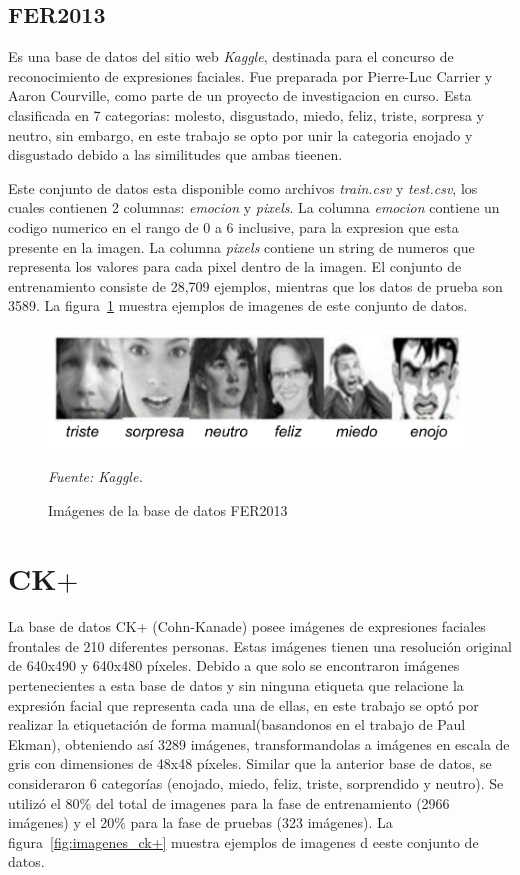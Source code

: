 \subsection{FER2013}
Es una base de datos del sitio web \textit{Kaggle}, destinada para el concurso de reconocimiento de expresiones faciales. Fue preparada por Pierre-Luc Carrier y Aaron Courville, como parte de un proyecto de investigacion en curso. Esta clasificada en 7 categorias: molesto, disgustado, miedo, feliz, triste, sorpresa y neutro, sin embargo, en este trabajo se opto por unir la categoria enojado y disgustado debido a las similitudes que ambas tieenen.

Este conjunto de datos esta disponible como archivos \textit{train.csv} y \textit{test.csv}, los cuales contienen 2 columnas: \textit{emocion} y \textit{pixels}. La columna \textit{emocion} contiene un codigo numerico en el rango de 0 a 6 inclusive, para la expresion que esta presente en la imagen. La columna \textit{pixels} contiene un string de numeros que representa los valores para cada pixel dentro de la imagen. El conjunto de entrenamiento consiste de 28,709 ejemplos, mientras que los datos de prueba son 3589. La figura~\ref{fig:imagenes_fer} muestra ejemplos de imagenes de este conjunto de datos.


\begin{figure}[H]
		\centering
		\includegraphics[width=110mm]{Imagenes/imagenes_fer.pdf}
		\caption{Imágenes de la base de datos FER2013}
		\vspace{0.15cm}
		\textit{Fuente: Kaggle.}
		\label{fig:imagenes_fer}
\end{figure}

\section{CK$+$}
La base de datos CK+ (Cohn-Kanade) posee imágenes de expresiones faciales frontales de 210 diferentes personas. Estas imágenes tienen una resolución original de 640x490 y 640x480 píxeles. Debido a que solo se encontraron imágenes pertenecientes a esta base de datos y sin ninguna etiqueta que relacione la expresión facial que representa cada una de ellas, en este trabajo se optó por realizar la etiquetación de forma manual(basandonos en el trabajo de Paul Ekman), obteniendo así 3289 imágenes, transformandolas a imágenes en escala de gris con dimensiones de 48x48 píxeles. Similar que la anterior base de datos, se consideraron 6 categorías (enojado, miedo, feliz, triste, sorprendido y neutro). Se utilizó el 80\% del total de imagenes para la fase de entrenamiento (2966 imágenes) y el 20\% para la fase de pruebas (323 imágenes). La figura~\ref{fig:imagenes_ck+} muestra ejemplos de imagenes d eeste conjunto de datos.

